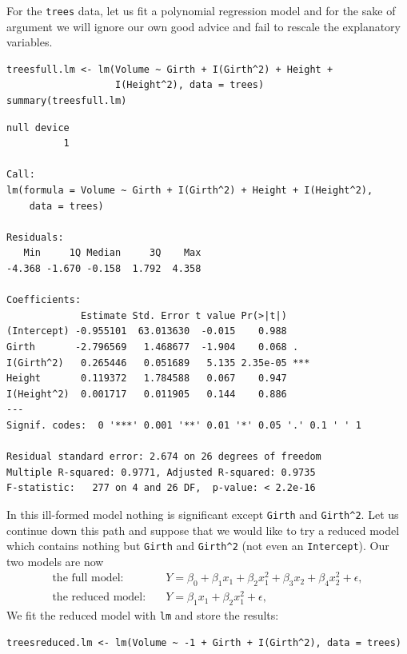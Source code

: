\documentclass[captions=tableheading]{scrbook}
\begin{document}
\begin{example}
\label{exa:mlr-trees-poly-no-rescale}

For the \texttt{trees} data, let us fit a polynomial regression model and for the sake of argument we will ignore our own good advice and fail to rescale the explanatory variables. 


\begin{verbatim}
treesfull.lm <- lm(Volume ~ Girth + I(Girth^2) + Height + 
                   I(Height^2), data = trees)
summary(treesfull.lm)
\end{verbatim}


\begin{verbatim}
null device 
          1
 
Call:
lm(formula = Volume ~ Girth + I(Girth^2) + Height + I(Height^2), 
    data = trees)

Residuals:
   Min     1Q Median     3Q    Max 
-4.368 -1.670 -0.158  1.792  4.358 

Coefficients:
             Estimate Std. Error t value Pr(>|t|)    
(Intercept) -0.955101  63.013630  -0.015    0.988    
Girth       -2.796569   1.468677  -1.904    0.068 .  
I(Girth^2)   0.265446   0.051689   5.135 2.35e-05 ***
Height       0.119372   1.784588   0.067    0.947    
I(Height^2)  0.001717   0.011905   0.144    0.886    
---
Signif. codes:  0 '***' 0.001 '**' 0.01 '*' 0.05 '.' 0.1 ' ' 1 

Residual standard error: 2.674 on 26 degrees of freedom
Multiple R-squared: 0.9771,	Adjusted R-squared: 0.9735 
F-statistic:   277 on 4 and 26 DF,  p-value: < 2.2e-16
\end{verbatim}

In this ill-formed model nothing is significant except \texttt{Girth} and \texttt{Girth\textasciicircum{}2}. Let us continue down this path and suppose that we would like to try a reduced model which contains nothing but \texttt{Girth} and \texttt{Girth\textasciicircum{}2} (not even an \texttt{Intercept}). Our two models are now
\begin{align*} 
\mbox{the full model:} & \quad Y=\beta_{0}+\beta_{1}x_{1}+\beta_{2}x_{1}^{2}+\beta_{3}x_{2}+\beta_{4}x_{2}^{2}+\epsilon,\\
\mbox{the reduced model:} & \quad Y=\beta_{1}x_{1}+\beta_{2}x_{1}^{2}+\epsilon,
\end{align*}
We fit the reduced model with \texttt{lm} and store the results:


\begin{verbatim}
treesreduced.lm <- lm(Volume ~ -1 + Girth + I(Girth^2), data = trees)
\end{verbatim}


\end{example}
\end{document}
